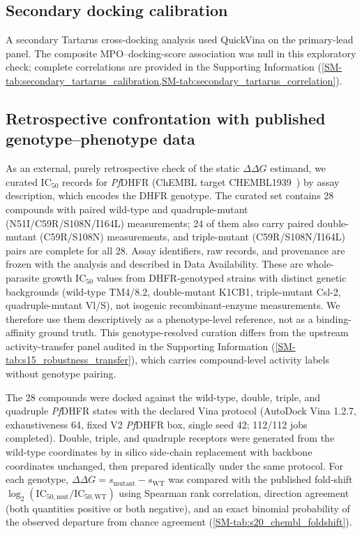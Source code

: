 \documentclass[journal=jcisd8,manuscript=article,layout=traditional]{achemso}
\begin{document}
\subsection{Secondary docking calibration}

A secondary Tartarus cross-docking analysis used QuickVina on the primary-lead panel. The composite MPO--docking-score association was null in this exploratory check; complete correlations are provided in the Supporting Information (\cref{SM-tab:secondary_tartarus_calibration,SM-tab:secondary_tartarus_correlation}).

\subsection{Retrospective confrontation with published genotype--phenotype data}

As an external, purely retrospective check of the static $\Delta\Delta G$ estimand, we curated IC$_{50}$ records for \textit{Pf}DHFR (ChEMBL target CHEMBL1939~\citep{zdrazil2024chembl}) by assay description, which encodes the DHFR genotype. The curated set contains 28 compounds with paired wild-type and quadruple-mutant (N51I/C59R/S108N/I164L) measurements; 24 of them also carry paired double-mutant (C59R/S108N) measurements, and triple-mutant (C59R/S108N/I164L) pairs are complete for all 28. Assay identifiers, raw records, and provenance are frozen with the analysis and described in Data Availability. These are whole-parasite growth IC$_{50}$ values from DHFR-genotyped strains with distinct genetic backgrounds (wild-type TM4/8.2, double-mutant K1CB1, triple-mutant Csl-2, quadruple-mutant Vl/S), not isogenic recombinant-enzyme measurements. We therefore use them descriptively as a phenotype-level reference, not as a binding-affinity ground truth. This genotype-resolved curation differs from the upstream activity-transfer panel audited in the Supporting Information (\cref{SM-tab:s15_robustness_transfer}), which carries compound-level activity labels without genotype pairing.

The 28 compounds were docked against the wild-type, double, triple, and quadruple \textit{Pf}DHFR states with the declared Vina protocol (AutoDock Vina 1.2.7, exhaustiveness \num{64}, fixed V2 \textit{Pf}DHFR box, single seed \num{42}; \num{112}/\num{112} jobs completed). Double, triple, and quadruple receptors were generated from the wild-type coordinates by in silico side-chain replacement with backbone coordinates unchanged, then prepared identically under the same protocol. For each genotype, $\Delta\Delta G = s_{\mathrm{mutant}} - s_{\mathrm{WT}}$ was compared with the published fold-shift $\log_2(\mathrm{IC}_{50,\mathrm{mut}}/\mathrm{IC}_{50,\mathrm{WT}})$ using Spearman rank correlation, direction agreement (both quantities positive or both negative), and an exact binomial probability of the observed departure from chance agreement (\cref{SM-tab:s20_chembl_foldshift}).
\end{document}
